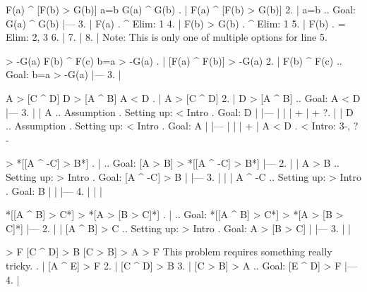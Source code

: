 \argument
 F(a) ^ [F(b) > G(b)]
 a=b
\argumentline
 G(a) ^ G(b)
\endargument
	\answer
	. | F(a) ^ [F(b) > G(b)]
	 2. | a=b          ..  Goal: G(a) ^ G(b)
	    |---
	 3. | F(a)         .  ^ Elim: 1
	 4. | F(b) > G(b)  .  ^ Elim: 1
	 5. | F(b)         .  = Elim: 2, 3
	 6. | 
	 7. | 
	 8. | 
	\endfitchproof
	\endanswer
Note: This is only one of multiple options for line 5.

\argument
 [F(a) ^ F(b)] > -G(a)
 F(b) ^ F(c)
\argumentline
 b=a > -G(a)
\endargument
	\answer
	. | [F(a) ^ F(b)] > -G(a)
	 2. | F(b) ^ F(c)    ..  Goal: b=a > -G(a)
	    |---
	 3. | 
	\endfitchproof
	\endanswer

\argument
 A > [C ^ D]
 D > [A ^ B]
\argumentline
 A < D
\endargument
	\answer
	. | A > [C ^ D]
	 2. | D > [A ^ B]  ..  Goal: A < D
	    |---
	 3. |   | A        ..  Assumption  .  Setting up: < Intro  .  Goal: D
	    |   |---
	    |   | 
	    |   +
	    |   +
	 ?. |   | D        ..  Assumption  .  Setting up: < Intro  .  Goal: A
	    |   |---
	    |   | 
	    |   +
	    | A < D        .  < Intro: 3-, ?-
	\endfitchproof
	\endanswer

\argument
\argumentline
 [A > B] > *[[A ^ -C] > B*]
\endargument
	\answer
	. |                 ..  Goal: [A > B] > *[[A ^ -C] > B*]
	    |---
	 2. |   | A > B       ..  Setting up: > Intro  .  Goal: [A ^ -C] > B
	    |   |---
	 3. |   |   | A ^ -C  ..  Setting up: > Intro  .  Goal: B
	    |   |   |---
	 4. |   |   | 
	\endfitchproof
	\endanswer

\argument
\argumentline
 *[[A ^ B] > C*] > *[A > [B > C]*]
\endargument
	\answer
	. |                    ..  Goal: *[[A ^ B] > C*] > *[A > [B > C]*]
	    |---
	 2. |   | [A ^ B] > C    ..  Setting up: > Intro  .  Goal: A > [B > C]
	    |   |---
	 3. |   | 
	\endfitchproof
	\endanswer

\argument
 [A ^ E] > F
 [C ^ D] > B
 [C > B] > A
\argumentline
 [E ^ D] > F
\endargument
\Hint This problem requires something really tricky.
	\answer
	. | [A ^ E] > F
	 2. | [C ^ D] > B
	 3. | [C > B] > A  ..  Goal: [E ^ D] > F
	    |---
	 4. | 
	\endfitchproof
	\endanswer

\endproblems
\bye
